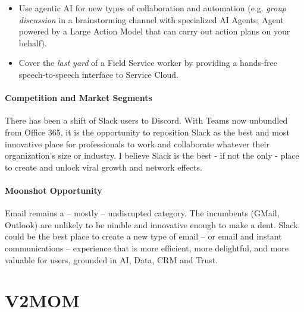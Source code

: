 \documentclass{tufte-handout}
\begin{document}
\begin{itemize}
  \item Use agentic AI for new types of collaboration and automation (e.g. \emph{group discussion} in a brainstorming channel with specialized AI Agents; Agent powered by a Large Action Model that can carry out  action plans on your behalf).
  \item Cover the \emph{last yard} of a Field Service worker by providing a hands-free speech-to-speech interface to Service Cloud.
\end{itemize}

\paragraph{Competition and Market Segments}\label{sec:competition-market-segments} There has been a shift of Slack users to Discord. With Teams now unbundled from Office 365, it is the opportunity to reposition Slack as the best and most innovative place for professionals to work and collaborate whatever their organization's size or industry.
I believe Slack is the best - if not the only - place to create and unlock viral growth and network effects.

\paragraph{Moonshot Opportunity}\label{sec:moonshot-opportunity} Email remains a -- mostly -- undisrupted category. The incumbents (GMail, Outlook) are unlikely to be nimble and innovative enough to make a dent. Slack could be the best place to create a new type of email -- or email and instant communications --  experience that is more efficient, more delightful, and more valuable for users, grounded in AI, Data, CRM and Trust.


\section{V2MOM}\label{sec:v2mom}
\end{document}
